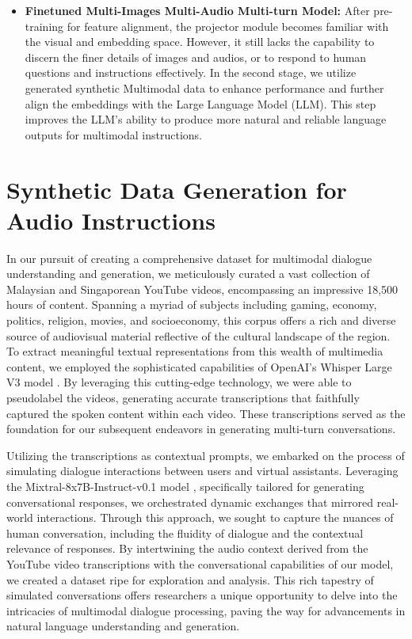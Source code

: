 \documentclass[preprint]{article}
\begin{document}
\begin{itemize}
  \item \textbf{Finetuned Multi-Images Multi-Audio Multi-turn Model:} After pre-training for feature alignment, the projector module becomes familiar with the visual and embedding space. However, it still lacks the capability to discern the finer details of images and audios, or to respond to human questions and instructions effectively. In the second stage, we utilize generated synthetic Multimodal data to enhance performance and further align the embeddings with the Large Language Model (LLM). This step improves the LLM's ability to produce more natural and reliable language outputs for multimodal instructions.

\end{itemize}

\section{Synthetic Data Generation for Audio Instructions}

In our pursuit of creating a comprehensive dataset for multimodal dialogue understanding and generation, we meticulously curated a vast collection of Malaysian and Singaporean YouTube videos, encompassing an impressive 18,500 hours of content. Spanning a myriad of subjects including gaming, economy, politics, religion, movies, and socioeconomy, this corpus offers a rich and diverse source of audiovisual material reflective of the cultural landscape of the region. To extract meaningful textual representations from this wealth of multimedia content, we employed the sophisticated capabilities of OpenAI's Whisper Large V3 model \cite{radford2022whisper}. By leveraging this cutting-edge technology, we were able to pseudolabel the videos, generating accurate transcriptions that faithfully captured the spoken content within each video. These transcriptions served as the foundation for our subsequent endeavors in generating multi-turn conversations.

Utilizing the transcriptions as contextual prompts, we embarked on the process of simulating dialogue interactions between users and virtual assistants. Leveraging the Mixtral-8x7B-Instruct-v0.1 model \cite{jiang2024mixtral}, specifically tailored for generating conversational responses, we orchestrated dynamic exchanges that mirrored real-world interactions. Through this approach, we sought to capture the nuances of human conversation, including the fluidity of dialogue and the contextual relevance of responses. By intertwining the audio context derived from the YouTube video transcriptions with the conversational capabilities of our model, we created a dataset ripe for exploration and analysis. This rich tapestry of simulated conversations offers researchers a unique opportunity to delve into the intricacies of multimodal dialogue processing, paving the way for advancements in natural language understanding and generation.
\end{document}
